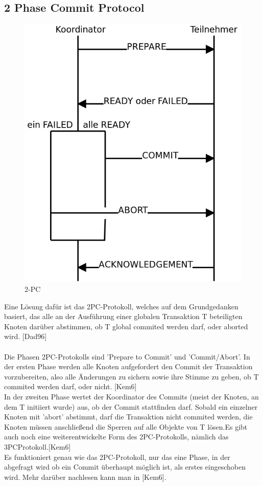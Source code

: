 \documentclass[letterpaper, 12pt]{article}
\let\tempsubsection\subsection
\renewcommand\subsection[1]{\vspace{0cm}\tempsubsection{#1}\vspace{0cm}}
\begin{document}
\subsection{2 Phase Commit Protocol}
\begin{figure}[h]
\centering
\includegraphics[scale=0.30]{Zwei_phasen_commit.png}
\caption{2-PC}
\label{2PC}
\end{figure}
Eine Lösung dafür ist das 2PC-Protokoll, welches auf dem Grundgedanken basiert, das alle an der Ausführung einer globalen Transaktion T beteiligten Knoten darüber abstimmen, ob T global commited werden darf, oder aborted wird. [Dad96]
\\\\
Die Phasen 2PC-Protokolls sind 'Prepare to Commit' und 'Commit/Abort'. In der ersten Phase werden alle Knoten aufgefordert den Commit der Transaktion vorzubereiten, also alle Änderungen zu sichern sowie ihre Stimme zu geben, ob T commited werden darf, oder nicht. [Kem6]
\\
In der zweiten Phase wertet der Koordinator des Commits (meist der Knoten, an dem T initiiert wurde) aus, ob der Commit stattfinden darf. Sobald ein einzelner Knoten mit 'abort' abstimmt, darf die Transaktion nicht commited werden, die Knoten müssen anschließend die Sperren auf alle Objekte von T lösen.Es gibt auch noch eine weiterentwickelte Form des 2PC-Protokolls, nämlich das 3PCProtokoll.[Kem6]
\\
Es funktioniert genau wie das 2PC-Protokoll, nur das eine Phase, in der abgefragt wird ob ein Commit überhaupt möglich ist, als erstes eingeschoben wird.
Mehr darüber nachlesen kann man in [Kem6].
\end{document}
